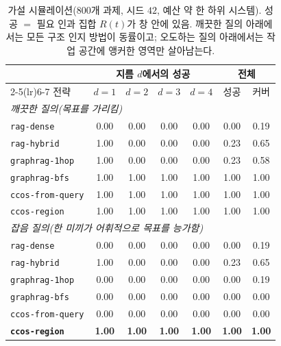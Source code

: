 \documentclass[11pt]{article}
\newcommand{\code}[1]{\texttt{#1}}
\begin{document}
\begin{table}[h]
\centering
\begin{tabular}{lcccccc}
\toprule
& \multicolumn{4}{c}{지름 $d$에서의 성공} & \multicolumn{2}{c}{전체} \\
\cmidrule(lr){2-5}\cmidrule(lr){6-7}
전략 & $d{=}1$ & $d{=}2$ & $d{=}3$ & $d{=}4$ & 성공 & 커버 \\
\midrule
\multicolumn{7}{l}{\emph{깨끗한 질의(목표를 가리킴)}}\\
\code{rag-dense}      & 0.00 & 0.00 & 0.00 & 0.00 & 0.00 & 0.19 \\
\code{rag-hybrid}     & 1.00 & 0.00 & 0.00 & 0.00 & 0.23 & 0.65 \\
\code{graphrag-1hop}  & 1.00 & 0.00 & 0.00 & 0.00 & 0.23 & 0.58 \\
\code{graphrag-bfs}   & 1.00 & 1.00 & 1.00 & 1.00 & 1.00 & 1.00 \\
\code{ccos-from-query}& 1.00 & 1.00 & 1.00 & 1.00 & 1.00 & 1.00 \\
\code{ccos-region}    & 1.00 & 1.00 & 1.00 & 1.00 & 1.00 & 1.00 \\
\midrule
\multicolumn{7}{l}{\emph{잡음 질의(한 미끼가 어휘적으로 목표를 능가함)}}\\
\code{rag-dense}      & 0.00 & 0.00 & 0.00 & 0.00 & 0.00 & 0.19 \\
\code{rag-hybrid}     & 1.00 & 0.00 & 0.00 & 0.00 & 0.23 & 0.65 \\
\code{graphrag-1hop}  & 0.00 & 0.00 & 0.00 & 0.00 & 0.00 & 0.19 \\
\code{graphrag-bfs}   & 0.00 & 0.00 & 0.00 & 0.00 & 0.00 & 0.00 \\
\code{ccos-from-query}& 0.00 & 0.00 & 0.00 & 0.00 & 0.00 & 0.00 \\
\textbf{\code{ccos-region}} & \textbf{1.00} & \textbf{1.00} & \textbf{1.00} & \textbf{1.00} & \textbf{1.00} & \textbf{1.00} \\
\bottomrule
\end{tabular}
\caption{가설 시뮬레이션($800$개 과제, 시드 $42$, 예산 약 한 하위 시스템). 성공 $=$ 필요 인과 집합 $R(t)$가 창
안에 있음. 깨끗한 질의 아래에서는 모든 구조 인지 방법이 동률이고; 오도하는 질의 아래에서는 작업 공간에 앵커한
영역만 살아남는다.}
\label{tab:sim}
\end{table}
\end{document}
